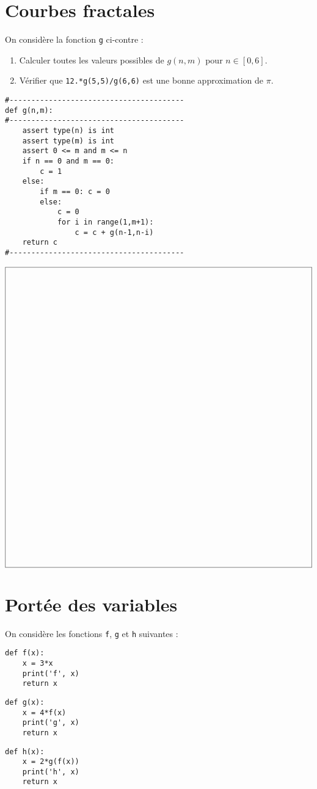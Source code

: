 \documentclass[11pt,a4paper]{article}
\begin{document}
\section{Courbes fractales}
\begin{minipage}[t]{7cm}
On consid\`ere la fonction {\tt g} ci-contre :
\begin{enumerate}
\item Calculer toutes les valeurs possibles
	de $g(n,m)$ pour $n \in [0,6]$.
\item Vérifier que {\tt 12.*g(5,5)/g(6,6)} est une bonne approximation de
	$\pi$.
\end{enumerate}
\end{minipage}
\hfill
\begin{minipage}[t]{7cm}
\begin{verbatim}
#----------------------------------------
def g(n,m):
#----------------------------------------
    assert type(n) is int
    assert type(m) is int
    assert 0 <= m and m <= n
    if n == 0 and m == 0:
        c = 1
    else:
        if m == 0: c = 0
        else:
            c = 0
            for i in range(1,m+1):
                c = c + g(n-1,n-i)
    return c
#----------------------------------------
\end{verbatim}
\end{minipage}


$$\framebox[14.5cm]{$\rule{0cm}{14cm}$}$$

\section{Portée des variables}
On considère les fonctions {\tt f}, {\tt g} et {\tt h} suivantes :
\begin{center}
\begin{py}{4cm}
\begin{verbatim}
def f(x):
    x = 3*x
    print('f', x)
    return x
\end{verbatim}
\end{py}\hspace*{1cm}
\begin{py}{4cm}
\begin{verbatim}
def g(x):
    x = 4*f(x)
    print('g', x)
    return x
\end{verbatim}
\end{py}\hspace*{1cm}
\begin{py}{4cm}
\begin{verbatim}
def h(x):
    x = 2*g(f(x))
    print('h', x)
    return x
\end{verbatim}
\end{py}
\end{center}
\end{document}
